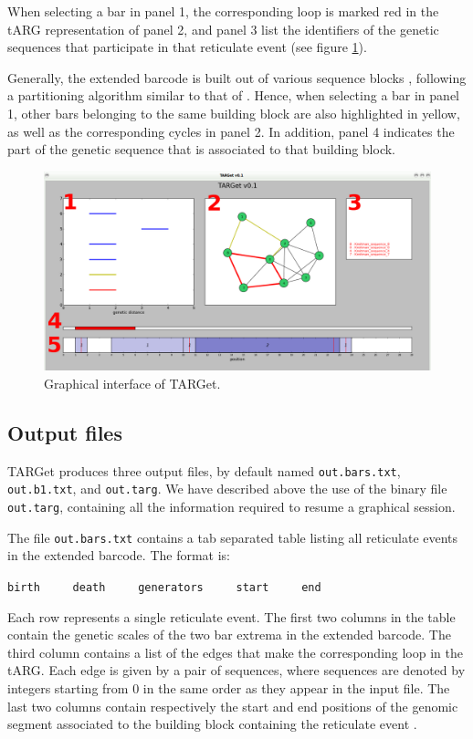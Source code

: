 \documentclass[12pt]{article}
\begin{document}
When selecting a bar in panel 1, the corresponding loop is marked red in the tARG representation of panel 2, and panel 3 list the identifiers of the genetic sequences that participate in that reticulate event (see figure \ref{fig2}). 

Generally, the extended barcode is built out of various sequence blocks \cite{target}, following a partitioning algorithm similar to that of \cite{mg}. Hence, when selecting a bar in panel 1, other bars belonging to the same building block are also highlighted in yellow, as well as the corresponding cycles in panel 2. In addition, panel 4 indicates the part of the genetic sequence that is associated to that building block.

\begin{figure}[!ht]
\centering
\includegraphics[width=15.cm, angle=0]{Screenshot.png}
\caption{Graphical interface of TARGet.
\label{fig2}}
\end{figure} 


\subsection*{Output files}

TARGet produces three output files, by default named \texttt{out.bars.txt}, \texttt{out.b1.txt}, and \texttt{out.targ}. We have described above the use of the binary file \texttt{out.targ}, containing all the information required to resume a graphical session.

The file \texttt{out.bars.txt} contains a tab separated table listing all reticulate events in the extended barcode. The format is:

\texttt{birth\ \ \ \ \ death\ \ \ \ \ generators\ \ \ \ \ start\ \ \ \ \ end}

\noindent Each row represents a single reticulate event. The first two columns in the table contain the genetic scales of the two bar extrema in the extended barcode. The third column contains a list of the edges that make the corresponding loop in the tARG. Each edge is given by a pair of sequences, where sequences are denoted by integers starting from 0 in the same order as they appear in the input file. The last two columns contain respectively the start and end positions of the genomic segment associated to the building block containing the reticulate event \cite{target}. 
\end{document}
